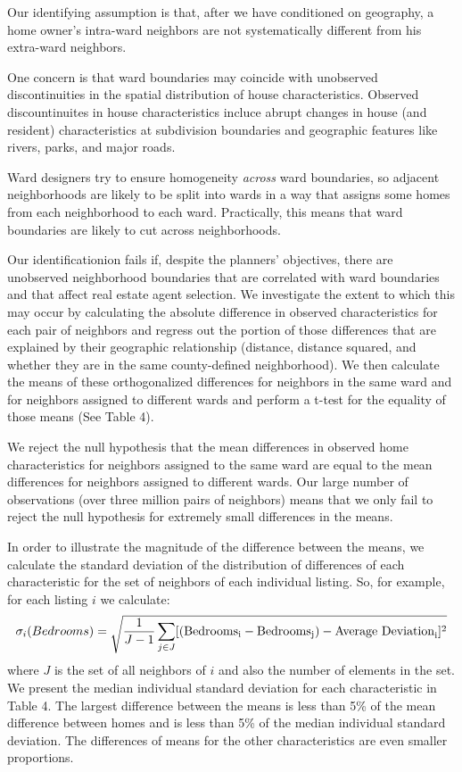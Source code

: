 \documentclass[12pt]{article}
\begin{document}
    Our identifying assumption is that, after we have conditioned on geography, a home owner's intra-ward neighbors are not systematically different from his extra-ward neighbors.

    One concern is that ward boundaries may coincide with unobserved discontinuities in the spatial distribution of house characteristics.  Observed discountinuites in house characteristics incluce abrupt changes in house (and resident) characteristics at subdivision boundaries and geographic features like rivers, parks, and major roads.

    Ward designers try to ensure homogeneity \emph{across} ward boundaries, so adjacent neighborhoods are likely to be split into wards in a way that assigns some homes from each neighborhood to each ward. Practically, this means that ward boundaries are likely to cut across neighborhoods.

    Our identificationion fails if, despite the planners' objectives, there are unobserved neighborhood boundaries that are correlated with ward boundaries and that affect real estate agent selection. We investigate the extent to which this may occur by calculating the absolute difference in observed characteristics for each pair of neighbors and regress out the portion of those differences that are explained by their geographic relationship (distance, distance squared, and whether they are in the same county-defined neighborhood). We then calculate the means of these orthogonalized differences for neighbors in the same ward and for neighbors assigned to different wards and perform a t-test for the equality of those means (See Table 4).

    We reject the null hypothesis that the mean differences in observed home characteristics for neighbors assigned to the same ward are equal to the
    mean differences for neighbors assigned to different wards. Our large number of observations (over three million pairs of neighbors) means that we only fail to reject the null hypothesis for extremely small differences in the means.

    In order to illustrate the magnitude of the difference between the means, we calculate the standard deviation of the distribution of differences of each characteristic for the set of neighbors of each individual listing. So, for example, for each listing $i$ we calculate: \[\sigma_i(Bedrooms) = \sqrt{\frac{1}{J-1}\sum_{j \in J}[(\rm{Bedrooms}_i - \rm{Bedrooms}_j) - \rm{Average \ Deviation}_i]^2}\] where $J$ is the set of all neighbors of $i$ and also the number of elements in the set. We present the median individual standard deviation for each characteristic in Table 4. The largest difference between the means is less than 5\% of the mean difference between homes and is less than 5\% of the median individual standard deviation. The differences of means for the other characteristics are even smaller proportions.
\end{document}
